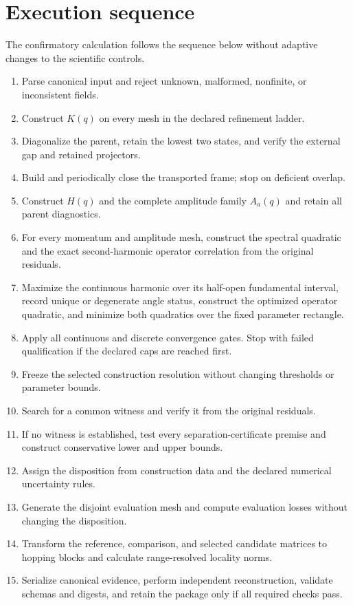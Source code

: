 \documentclass[11pt]{article}
\begin{document}
\section{Execution sequence}

The confirmatory calculation follows the sequence below without adaptive changes to the
scientific controls.

\begin{enumerate}[label=\arabic*.]
  \item Parse canonical input and reject unknown, malformed, nonfinite, or inconsistent
        fields.
  \item Construct $K(q)$ on every mesh in the declared refinement ladder.
  \item Diagonalize the parent, retain the lowest two states, and verify the external
        gap and retained projectors.
  \item Build and periodically close the transported frame; stop on deficient overlap.
  \item Construct $H(q)$ and the complete amplitude family $A_a(q)$ and retain all
        parent diagnostics.
  \item For every momentum and amplitude mesh, construct the spectral quadratic and the
        exact second-harmonic operator correlation from the original residuals.
  \item Maximize the continuous harmonic over its half-open fundamental interval,
        record unique or degenerate angle status, construct the optimized operator
        quadratic, and minimize both quadratics over the fixed parameter rectangle.
  \item Apply all continuous and discrete convergence gates. Stop with failed
        qualification if the declared caps are reached first.
  \item Freeze the selected construction resolution without changing thresholds or
        parameter bounds.
  \item Search for a common witness and verify it from the original residuals.
  \item If no witness is established, test every separation-certificate premise and
        construct conservative lower and upper bounds.
  \item Assign the disposition from construction data and the declared numerical
        uncertainty rules.
  \item Generate the disjoint evaluation mesh and compute evaluation losses without
        changing the disposition.
  \item Transform the reference, comparison, and selected candidate matrices to hopping
        blocks and calculate range-resolved locality norms.
  \item Serialize canonical evidence, perform independent reconstruction, validate
        schemas and digests, and retain the package only if all required checks pass.
\end{enumerate}
\end{document}
